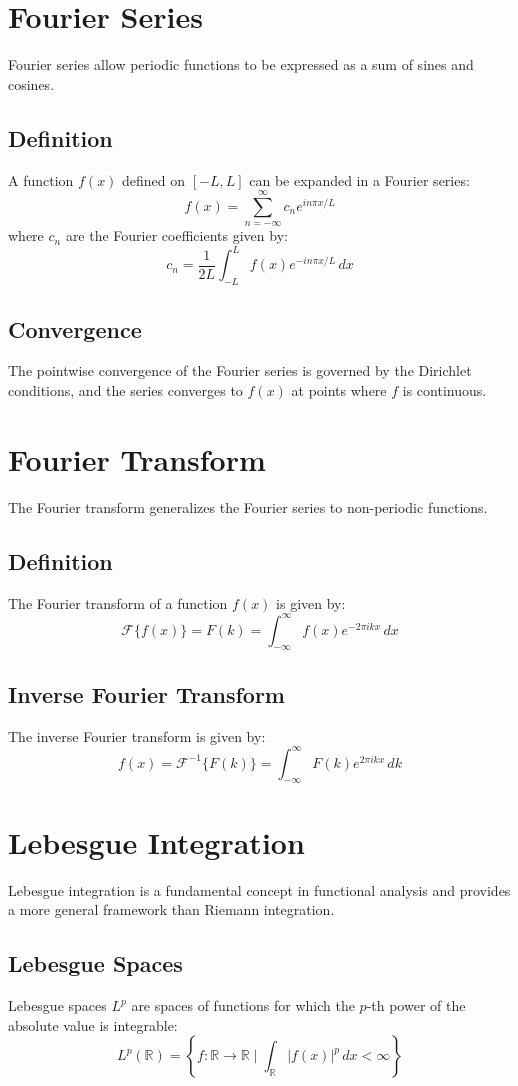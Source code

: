 \documentclass{article}
\begin{document}
\section{Fourier Series}
Fourier series allow periodic functions to be expressed as a sum of sines and cosines.

\subsection{Definition}
A function \(f(x)\) defined on \([-L, L]\) can be expanded in a Fourier series:
\[
f(x) = \sum_{n=-\infty}^{\infty} c_n e^{i n \pi x / L}
\]
where \(c_n\) are the Fourier coefficients given by:
\[
c_n = \frac{1}{2L} \int_{-L}^{L} f(x) e^{-i n \pi x / L} \, dx
\]

\subsection{Convergence}
The pointwise convergence of the Fourier series is governed by the Dirichlet conditions, and the series converges to \(f(x)\) at points where \(f\) is continuous.

\section{Fourier Transform}
The Fourier transform generalizes the Fourier series to non-periodic functions.

\subsection{Definition}
The Fourier transform of a function \(f(x)\) is given by:
\[
\mathcal{F}\{f(x)\} = F(k) = \int_{-\infty}^{\infty} f(x) e^{-2 \pi i k x} \, dx
\]

\subsection{Inverse Fourier Transform}
The inverse Fourier transform is given by:
\[
f(x) = \mathcal{F}^{-1}\{F(k)\} = \int_{-\infty}^{\infty} F(k) e^{2 \pi i k x} \, dk
\]

\section{Lebesgue Integration}
Lebesgue integration is a fundamental concept in functional analysis and provides a more general framework than Riemann integration.

\subsection{Lebesgue Spaces}
Lebesgue spaces \(L^p\) are spaces of functions for which the \(p\)-th power of the absolute value is integrable:
\[
L^p(\mathbb{R}) = \left\{ f : \mathbb{R} \to \mathbb{R} \mid \int_{\mathbb{R}} |f(x)|^p \, dx < \infty \right\}
\]
\end{document}
